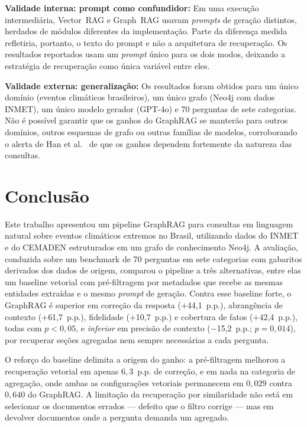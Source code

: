 \documentclass[conference]{IEEEtran}
\begin{document}
\textbf{Validade interna: prompt como confundidor:}
Em uma execução intermediária, Vector~RAG e Graph~RAG usavam
\textit{prompts} de geração distintos, herdados de módulos diferentes
da implementação. Parte da diferença medida refletiria, portanto, o
texto do prompt e não a arquitetura de recuperação. Os resultados
reportados usam um \textit{prompt} único para os dois modos, deixando a
estratégia de recuperação como única variável entre eles.

\textbf{Validade externa: generalização:}
Os resultados foram obtidos para um único domínio (eventos
climáticos brasileiros), um único grafo (Neo4j com dados INMET),
um único modelo gerador (GPT-4o) e 70 perguntas de sete
categorias.
Não é possível garantir que os ganhos do GraphRAG se manterão
para outros domínios, outros esquemas de grafo ou outras famílias
de modelos, corroborando o alerta de Han et al.~\cite{han2025ragvsgraphrag}
de que os ganhos dependem fortemente da natureza das consultas.

\section{Conclusão}
\label{sec:conclusao}

Este trabalho apresentou um pipeline GraphRAG para consultas em
linguagem natural sobre eventos climáticos extremos no Brasil,
utilizando dados do INMET e do CEMADEN estruturados em um grafo
de conhecimento Neo4j.
A avaliação, conduzida sobre um benchmark de 70 perguntas em sete
categorias com gabaritos derivados dos dados de origem, comparou o pipeline a
três alternativas, entre elas um baseline vetorial com pré-filtragem por
metadados que recebe as mesmas entidades extraídas e o mesmo \textit{prompt} de
geração. Contra esse baseline forte, o GraphRAG é superior em correção da
resposta ($+$44,1~p.p.), abrangência de contexto ($+$61,7~p.p.), fidelidade
($+$10,7~p.p.) e cobertura de fatos ($+$42,4~p.p.), todas com $p<0{,}05$, e
\emph{inferior} em precisão de contexto ($-$15,2~p.p.; $p=0{,}014$), por
recuperar seções agregadas nem sempre necessárias a cada pergunta.

O reforço do baseline delimita a origem do ganho: a pré-filtragem melhorou a
recuperação vetorial em apenas $6{,}3$~p.p. de correção, e em nada na categoria
de agregação, onde ambas as configurações vetoriais permanecem em $0{,}029$
contra $0{,}640$ do GraphRAG. A limitação da recuperação por similaridade não
está em selecionar os documentos errados --- defeito que o filtro corrige ---
mas em devolver documentos onde a pergunta demanda um agregado.
\end{document}
